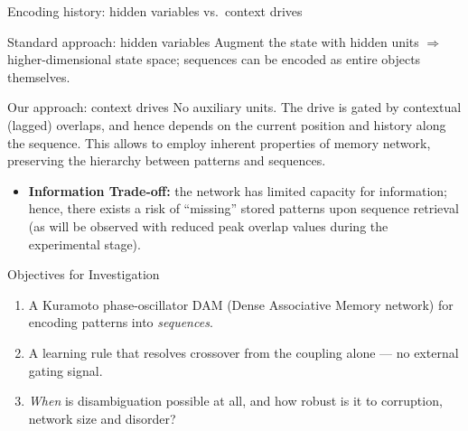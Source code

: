 \documentclass[aspectratio=169]{beamer}
\newcommand{\TODO}[1]{{\color{red}\textbf{[TODO: #1]}}}
\begin{document}
\begin{frame}{Encoding history: hidden variables vs.\ context drives}
  \begin{block}{Standard approach: hidden variables}
    Augment the state with hidden units $\Rightarrow$ higher-dimensional state space; sequences can be encoded as entire objects themselves.
  \end{block}
  \begin{block}{Our approach: context drives}
    No auxiliary units. The drive is gated by contextual (lagged) overlaps, and hence
    depends on the current position and history along the sequence. This allows to employ inherent properties of memory network, preserving the hierarchy between patterns and sequences.
  \end{block}
  \begin{itemize}
    \item \textbf{Information Trade-off:} the network has limited capacity for information; hence, there exists a risk of ``missing'' stored patterns upon sequence retrieval (as will be observed with reduced peak overlap values during the experimental stage).
  \end{itemize}
\end{frame}

\begin{frame}{Objectives for Investigation}
  \begin{enumerate}
    \item A Kuramoto phase-oscillator DAM (Dense Associative Memory network) for encoding patterns into \emph{sequences}.
    \item A learning rule that resolves crossover from the coupling alone
      --- no external gating signal.
    \item \emph{When} is disambiguation possible at all, and how robust is
      it to corruption, network size and disorder?
  \end{enumerate}
\end{frame}
\end{document}
